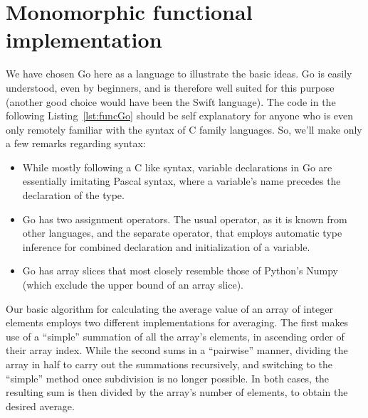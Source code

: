 \documentclass[11pt,oneside]{report}
\newcommand{\code}[1]{{\selectfont\ttfamily{#1}}}
\begin{document}
\section{Monomorphic functional implementation}
\label{sect:mono_functional}

We have chosen Go here as a language to illustrate the basic ideas.
Go is easily understood, even by beginners, and is therefore well
suited for this purpose (another good choice would have been the Swift
language). The code in the following Listing~\ref{lst:funcGo} should
be self explanatory for anyone who is even only remotely familiar with
the syntax of C family languages. So, we'll make only a few remarks
regarding syntax:
\begin{itemize}
\item
  While mostly following a C like syntax, variable declarations in Go
  are essentially imitating Pascal syntax, where a variable's name
  precedes the declaration of the type.
\item
  Go has two assignment operators. The usual \code{=} operator, as it
  is known from other languages, and the separate \code{:=} operator,
  that employs automatic type inference for combined declaration and
  initialization of a variable.
\item
  Go has array slices that most closely resemble those of Python's
  Numpy (which exclude the upper bound of an array slice).
\end{itemize}

Our basic algorithm for calculating the average value of an array of
integer elements employs two different implementations for
averaging. The first makes use of a ``simple'' summation of all the
array's elements, in ascending order of their array index. While the
second sums in a ``pairwise'' manner, dividing the array in half to
carry out the summations recursively, and switching to the ``simple''
method once subdivision is no longer possible. In both cases, the
resulting sum is then divided by the array's number of elements, to
obtain the desired average.


\end{document}
